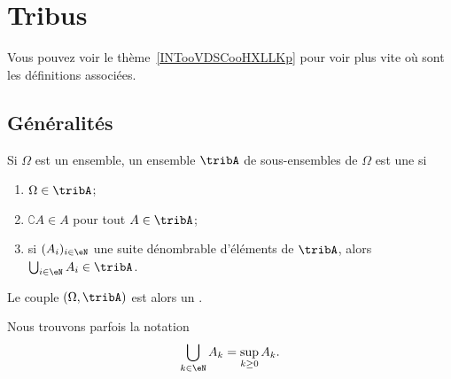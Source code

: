 
\section{Tribus}

Vous pouvez voir le thème~\ref{INTooVDSCooHXLLKp} pour voir plus vite où sont les définitions associées.

\subsection{Généralités}

\begin{definition}  \label{DefjRsGSy}
    Si \( \Omega\) est un ensemble, un ensemble \( \tribA\) de sous-ensembles de \( \Omega\) est une  si
    \begin{enumerate}
        \item
            \( \Omega\in\tribA\);
        \item
            \( \complement A\in A\) pour tout \( A\in\tribA\);
        \item       \label{ItemooPEQNooYiYNtN}
            si \( (A_i)_{i\in \eN}\) une suite dénombrable d'éléments de \( \tribA\), alors \( \bigcup_{i\in \eN}A_i\in\tribA\).
    \end{enumerate}
    Le couple \( (\Omega,\tribA)\) est alors un .
\end{definition}

\begin{remark}
    Nous trouvons parfois la notation
    \begin{equation}
        \bigcup_{k\in \eN}A_k=\sup_{k\geq 0}A_k.
    \end{equation}
\end{remark}

